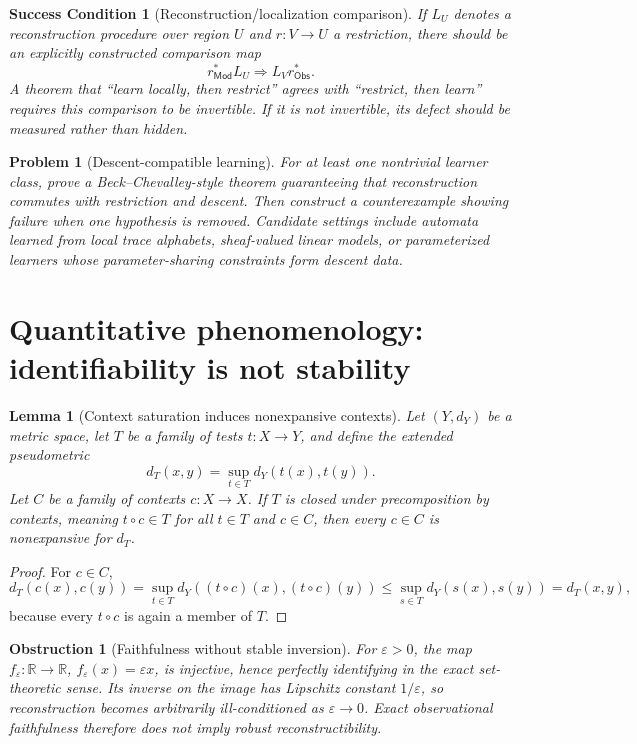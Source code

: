 \documentclass[11pt]{article}
\newtheorem{lemma}[theorem]{Lemma}
\newtheorem{condition}[theorem]{Success Condition}
\newtheorem{problem}[theorem]{Problem}
\newtheorem{obstruction}[theorem]{Obstruction}
\theoremstyle{definition}
\theoremstyle{remark}
\newcommand{\Obs}{\mathsf{Obs}}
\newcommand{\Mod}{\mathsf{Mod}}
\newcommand{\eps}{\varepsilon}
\begin{document}
\begin{condition}[Reconstruction/localization comparison]
If $L_U$ denotes a reconstruction procedure over region $U$ and $r:V\to U$ a restriction, there should be an explicitly constructed comparison map
\[
r_{\Mod}^{*}L_U\Longrightarrow L_V r_{\Obs}^{*}.
\]
A theorem that ``learn locally, then restrict'' agrees with ``restrict, then learn'' requires this comparison to be invertible. If it is not invertible, its defect should be measured rather than hidden.
\end{condition}

\begin{problem}[Descent-compatible learning]
For at least one nontrivial learner class, prove a Beck--Chevalley-style theorem guaranteeing that reconstruction commutes with restriction and descent. Then construct a counterexample showing failure when one hypothesis is removed. Candidate settings include automata learned from local trace alphabets, sheaf-valued linear models, or parameterized learners whose parameter-sharing constraints form descent data.
\end{problem}

\section{Quantitative phenomenology: identifiability is not stability}

\begin{lemma}[Context saturation induces nonexpansive contexts]
Let $(Y,d_Y)$ be a metric space, let $T$ be a family of tests $t:X\to Y$, and define the extended pseudometric
\[
d_T(x,y)=\sup_{t\in T}d_Y(t(x),t(y)).
\]
Let $C$ be a family of contexts $c:X\to X$. If $T$ is closed under precomposition by contexts, meaning $t\circ c\in T$ for all $t\in T$ and $c\in C$, then every $c\in C$ is nonexpansive for $d_T$.
\end{lemma}

\begin{proof}
For $c\in C$,
\[
d_T(c(x),c(y))=\sup_{t\in T}d_Y((t\circ c)(x),(t\circ c)(y))\leq \sup_{s\in T}d_Y(s(x),s(y))=d_T(x,y),
\]
because every $t\circ c$ is again a member of $T$.
\end{proof}

\begin{obstruction}[Faithfulness without stable inversion]
For $\eps>0$, the map $f_\eps:\mathbb R\to\mathbb R$, $f_\eps(x)=\eps x$, is injective, hence perfectly identifying in the exact set-theoretic sense. Its inverse on the image has Lipschitz constant $1/\eps$, so reconstruction becomes arbitrarily ill-conditioned as $\eps\to0$. Exact observational faithfulness therefore does not imply robust reconstructibility.
\end{obstruction}
\end{document}
